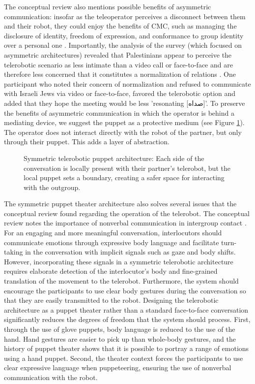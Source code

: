 \documentclass[dissertation,math,vertlayout,pdfa,colorlinks]{aaltoseries}
\begin{document}
The conceptual review also mentions possible benefits of asymmetric communication: insofar as the teleoperator perceives a disconnect between them and their robot, they could enjoy the benefits of CMC, such as managing the disclosure of identity, freedom of expression, and conformance to group identity over a personal one \cite[p. 78]{peledTelerobotContactHypothesis2022}. Importantly, the analysis of the survey (which focused on asymmetric architectures) revealed that Palestinians appear to perceive the telerobotic scenario as less intimate than a video call or face-to-face and are therefore less concerned that it constitutes a normalization of relations \cite[p. 13]{peledTeleroboticIntergroupContact2024}. One participant who noted their concern of normalization and refused to communicate with Israeli Jews via video or face-to-face, favored the telerobotic option and added that they hope the meeting would be less 'resonating [\foreignlanguage{arabic}{صداه}]'. To preserve the benefits of asymmetric communication in which the operator is behind a mediating device, we suggest the puppet as a protective medium (see Figure \ref{fig:symmetric-telepuppetry}). The operator does not interact directly with the robot of the partner, but only through their puppet. This adds a layer of abstraction.

\begin{figure}
    \centering
    
    \caption{Symmetric telerobotic puppet architecture: Each side of the conversation is locally present with their partner's telerobot, but the local puppet sets a boundary, creating a safer space for interacting with the outgroup.}
    \label{fig:symmetric-telepuppetry}
\end{figure}

The symmetric puppet theater architecture also solves several issues that the conceptual review found regarding the operation of the telerobot. The conceptual review notes the importance of nonverbal communication in intergroup contact \cite[p. 84]{peledTelerobotContactHypothesis2022}. For an engaging and more meaningful conversation, interlocutors should communicate emotions through expressive body language and facilitate turn-taking in the conversation with implicit signals such as gaze and body shifts. However, incorporating these signals in a symmetric telerobotic architecture requires elaborate detection of the interlocutor's body and fine-grained translation of the movement to the telerobot. Furthermore, the system should encourage the participants to use clear body gestures during the conversation so that they are easily transmitted to the robot. Designing the telerobotic architecture as a puppet theater rather than a standard face-to-face conversation significantly reduces the degrees of freedom that the system should process. First, through the use of glove puppets, body language is reduced to the use of the hand. Hand gestures are easier to pick up than whole-body gestures, and the history of puppet theater shows that it is possible to portray a range of emotions using a hand puppet. Second, the theater context forces the participants to use clear expressive language when puppeteering, ensuring the use of nonverbal communication with the robot.
\end{document}
